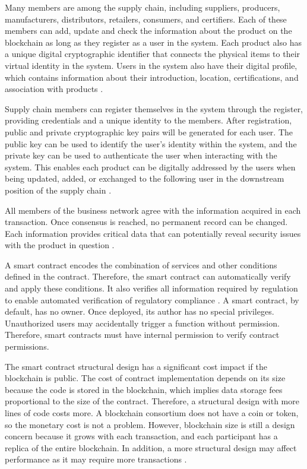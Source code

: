 Many members are among the supply chain, including suppliers, producers, manufacturers, distributors, retailers, consumers, and certifiers. Each of these members can add, update and check the information about the product on the blockchain as long as they register as a user in the system. Each product also has a unique digital cryptographic identifier that connects the physical items to their virtual identity in the system. Users in the system also have their digital profile, which contains information about their introduction, location, certifications, and association with products \cite{tian2017supply}.

Supply chain members can register themselves in the system through the register, providing credentials and a unique identity to the members. After registration, public and private cryptographic key pairs will be generated for each user. The public key can be used to identify the user's identity within the system, and the private key can be used to authenticate the user when interacting with the system. This enables each product can be digitally addressed by the users when being updated, added, or exchanged to the following user in the downstream position of the supply chain \cite{caro2018blockchain}.

All members of the business network agree with the information acquired in each transaction. Once consensus is reached, no permanent record can be changed. Each information provides critical data that can potentially reveal security issues with the product in question \cite{galvez2018future}.

A smart contract encodes the combination of services and other conditions defined in the contract. Therefore, the smart contract can automatically verify and apply these conditions. It also verifies all information required by regulation to enable automated verification of regulatory compliance \cite{lu2017adaptable}.  A smart contract, by default, has no owner. Once deployed, its author has no special privileges. Unauthorized users may accidentally trigger a function without permission. Therefore, smart contracts must have internal permission to verify contract permissions.

The smart contract structural design has a significant cost impact if the blockchain is public. The cost of contract implementation depends on its size because the code is stored in the blockchain, which implies data storage fees proportional to the size of the contract. Therefore, a structural design with more lines of code costs more. A blockchain consortium does not have a coin or token, so the monetary cost is not a problem. However, blockchain size is still a design concern because it grows with each transaction, and each participant has a replica of the entire blockchain. In addition, a more structural design may affect performance as it may require more transactions \cite{lu2017adaptable}.

